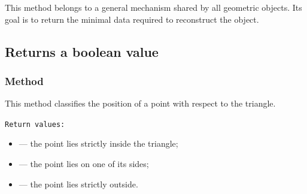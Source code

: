 \medskip

This method belongs to a general mechanism shared by all geometric objects. Its goal is to return the minimal data required to reconstruct the object.

\vspace{1em}

\begin{minipage}{.5\textwidth}
\let\tul\tkzUseLua
\begin{center}
\end{center}
\end{minipage}
\begin{minipage}{.5\textwidth}
\begin{tkzexample}
\end{tkzexample}
\end{minipage}

\subsection{Returns a boolean value}

\subsubsection{Method }
\label{ssub:method_triangle_position}

This method classifies the position of a point 
with respect to the triangle.

\medskip

\texttt{Return values: }
\begin{itemize}
  \item {}  — the point lies strictly inside the triangle;
  \item {}  — the point lies on one of its sides;
  \item {} — the point lies strictly outside.
\end{itemize}

